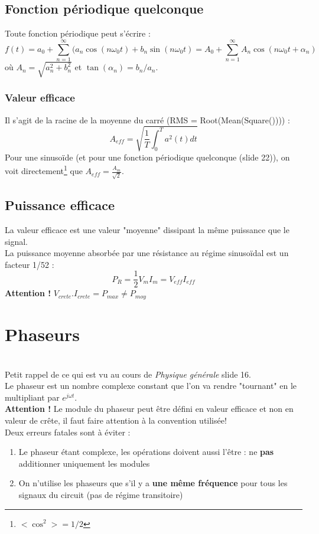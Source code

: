 \documentclass[british,french,11pt, a4paper, openany]{book}
\begin{document}
		\subsection{Fonction périodique quelconque}
		Toute fonction périodique peut s'écrire : 
		\begin{equation}
		f(t) = a_0 + \sum_{n=1}^\infty(a_n \cos(n\omega_0t) + b_n\sin(n\omega_0t) = A_0 + \sum_{n=1}^\infty A_n\cos(n\omega_0 t + \alpha_n)
		\end{equation}
		où $A_n = \sqrt{a^2_n + b^2_n}$ et $\tan(\alpha_n) = b_n/a_n$.
		
		\subsubsection{Valeur efficace}
		Il s'agit de la racine de la moyenne du carré (RMS = Root(Mean(Square()))) :
		\begin{equation}
		A_{eff} = \sqrt{\frac{1}{T}\int_0^T a^2(t) dt}
		\end{equation}
		Pour une sinusoïde (et pour une fonction périodique quelconque (slide 22)), on voit directement\footnote{$<\cos^2> = 1/2$} que $A_{eff} = \frac{A_m}{\sqrt{2}}$.
		
		\subsection{Puissance efficace}
		La valeur efficace est une valeur "moyenne" dissipant la même puissance que le signal.\\
		La puissance moyenne absorbée par une résistance au régime sinusoïdal est un facteur 1/52 :
		\begin{equation}
		P_R = \frac{1}{2}V_mI_m = V_{eff}I_{eff}
		\end{equation}
		\textbf{Attention !} $V_{crete}.I_{crete} = P_{max} \neq P_{moy}$
		\section{Phaseurs}
		\ \\
		Petit rappel de ce qui est vu au cours de \textit{Physique générale} slide 16.\\
		
		Le phaseur est un nombre complexe constant que l'on va rendre "tournant" en le multipliant par $e^{j\omega t}$.\\
		\textbf{Attention !} Le module du phaseur peut être défini en valeur efficace et non en valeur de crête, il faut faire attention à la convention utilisée! \\
		Deux erreurs fatales sont à éviter :
		\begin{enumerate}
			\item Le phaseur étant complexe, les opérations doivent aussi l'être : ne \textbf{pas} additionner uniquement les modules
			\item On n'utilise les phaseurs que s'il y a \textbf{une même fréquence} pour tous les signaux du circuit (pas de régime transitoire)
		\end{enumerate}
		\newpage
\end{document}
